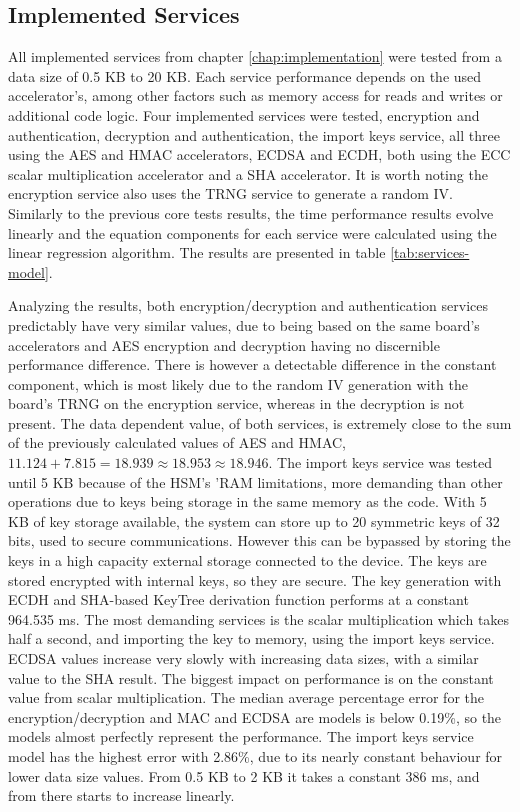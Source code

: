 \subsection{Implemented Services}\label{chap:evaluation:services}

All implemented services from chapter \ref{chap:implementation} were tested from a data size of 0.5 KB to 20 KB. Each service performance depends on the used accelerator's, among other factors such as memory access for reads and writes or additional code logic.
Four implemented services were tested, encryption and authentication, decryption and authentication, the import keys service, all three using the \ac{AES} and \ac{HMAC} accelerators, \ac{ECDSA} and \ac{ECDH}, both using the \ac{ECC} scalar multiplication accelerator and a \ac{SHA} accelerator. It is worth noting the encryption service also uses the \ac{TRNG} service to generate a random \ac{IV}.
Similarly to the previous core tests results, the time performance results evolve linearly and the equation components for each service were calculated using the linear regression algorithm. The results are presented in table \ref{tab:services-model}.



Analyzing the results, both encryption/decryption and authentication services predictably have very similar values, due to being based on the same board's accelerators and \ac{AES} encryption and decryption having no discernible performance difference.
There is however a detectable difference in the constant component, which is most likely due to the random \ac{IV} generation with the board's \ac{TRNG} on the encryption service, whereas in the decryption is not present.
The data dependent value, of both services, is extremely close to the sum of the previously calculated values of \ac{AES} and \ac{HMAC}, \(11.124+7.815=18.939\approx18.953\approx18.946\).
The import keys service was tested until 5 KB because of the \ac{HSM}'s '\ac{RAM} limitations, more demanding than other operations due to keys being storage in the same memory as the code. With 5 KB of key storage available, the system can store up to 20 symmetric keys of 32 bits, used to secure communications. However this can be bypassed by storing the keys in a high capacity external storage connected to the device. The keys are stored encrypted with internal keys, so they are secure.
The key generation with \ac{ECDH} and \ac{SHA}-based KeyTree derivation function performs at a constant 964.535 ms. The most demanding services is the scalar multiplication which takes half a second, and importing the key to memory, using the import keys service.
\ac{ECDSA} values increase very slowly with increasing data sizes, with a similar value to the \ac{SHA} result. The biggest impact on performance is on the constant value from scalar multiplication.
The median average percentage error for the encryption/decryption and MAC and \ac{ECDSA} are models is below 0.19\%, so the models almost perfectly represent the performance. The import keys service model has the highest error with 2.86\%, due to its nearly constant behaviour for lower data size values. From 0.5 KB to 2 KB it takes a constant 386 ms, and from there starts to increase linearly.

